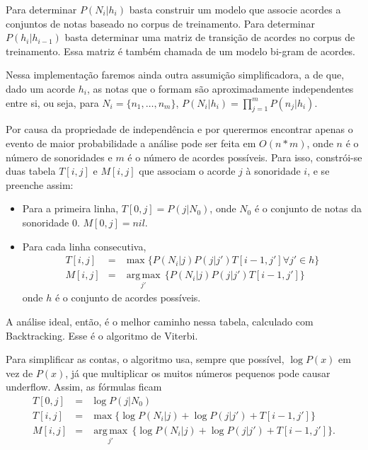 \documentclass{article}
\newcommand{\argmax}[1]{\underset{#1}{\operatorname{arg\,max}}\,}
\begin{document}
Para determinar $P(N_i|h_i)$ basta construir um modelo que associe
acordes a conjuntos de notas baseado no corpus de treinamento. Para
determinar $P(h_i|h_{i-1})$ basta determinar uma matriz de transição
de acordes no corpus de treinamento. Essa matriz é também chamada de
um modelo bi-gram de acordes.

Nessa implementação faremos ainda outra assumição simplificadora, a de
que, dado um acorde $h_i$, as notas que o formam são aproximadamente
independentes entre si, ou seja, para $N_i = \{n_1, \ldots , n_m\}$,
$P(N_i|h_i) = \prod_{j=1}^m P(n_j|h_i)$.

Por causa da propriedade de independência e por querermos encontrar
apenas o evento de maior probabilidade a análise pode ser feita em
$O(n*m)$, onde $n$ é o número de sonoridades e $m$ é o número de
acordes possíveis. Para isso, constrói-se duas tabela $T[i,j]$ e
$M[i,j]$ que associam o acorde $j$ à sonoridade $i$, e se preenche
assim:
\begin{itemize}
\item Para a primeira linha, $T[0,j] = P(j|N_0)$, onde $N_0$ é
  o conjunto de notas da sonoridade $0$. $M[0,j] = nil$.
\item Para cada linha consecutiva, 
  \begin{eqnarray}
 T[i,j] &=& \operatorname{max} \{ P(N_i|j)P(j|j')T[i-1,j'] \forall j' \in h \} \\
 M[i,j] &=& \argmax{j'} \{ P(N_i|j)P(j|j')T[i-1,j'] \}
\label{eq:1}
\end{eqnarray}
onde $h$ é o conjunto de acordes possíveis.
\end{itemize}
A análise ideal, então, é o melhor caminho nessa tabela, calculado com
Backtracking. Esse é o algoritmo de Viterbi.

Para simplificar as contas, o algoritmo usa, sempre que possível,
$\log P(x)$ em vez de $P(x)$, já que multiplicar os muitos números
pequenos pode causar underflow. Assim, as fórmulas ficam
\begin{eqnarray}
T[0,j] &=& \log P(j|N_0) \\
T[i,j] &=& \operatorname{max} \{ \log P(N_i|j) + \log P(j|j') + T[i-1,j'] \} \\
M[i,j] &=& \argmax{j'} \{ \log P(N_i|j) + \log P(j|j') + T[i-1,j']\}.
\label{eq:2}
\end{eqnarray}
\end{document}
